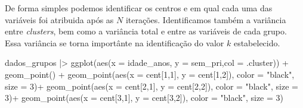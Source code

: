 \documentclass[
  letterpaper,
  DIV=11,
  numbers=noendperiod]{scrreprt}
\newenvironment{Shaded}{\begin{snugshade}}{\end{snugshade}}
\newcommand{\AttributeTok}[1]{\textcolor[rgb]{0.40,0.45,0.13}{#1}}
\newcommand{\DecValTok}[1]{\textcolor[rgb]{0.68,0.00,0.00}{#1}}
\newcommand{\FunctionTok}[1]{\textcolor[rgb]{0.28,0.35,0.67}{#1}}
\newcommand{\NormalTok}[1]{\textcolor[rgb]{0.00,0.23,0.31}{#1}}
\newcommand{\OtherTok}[1]{\textcolor[rgb]{0.00,0.23,0.31}{#1}}
\newcommand{\SpecialCharTok}[1]{\textcolor[rgb]{0.37,0.37,0.37}{#1}}
\newcommand{\StringTok}[1]{\textcolor[rgb]{0.13,0.47,0.30}{#1}}
\begin{document}
De forma simples podemos identificar os centros e em qual cada uma das
variáveis foi atribuida após as \(N\) iterações. Identificamos também a
variância entre \emph{clusters}, bem como a variância total e entre as
variáveis de cada grupo. Essa variância se torna importânte na
identificação do valor \(k\) estabelecido.

\begin{Shaded}
\end{Shaded}

\begin{Shaded}
\begin{Highlighting}[]
\NormalTok{dados\_grupos }\SpecialCharTok{|\textgreater{}} 
  \FunctionTok{ggplot}\NormalTok{(}\FunctionTok{aes}\NormalTok{(}\AttributeTok{x =}\NormalTok{ idade\_anos, }\AttributeTok{y =}\NormalTok{ sem\_pri,}\AttributeTok{col =}\NormalTok{ .cluster)) }\SpecialCharTok{+}
  \FunctionTok{geom\_point}\NormalTok{() }\SpecialCharTok{+}
  \FunctionTok{geom\_point}\NormalTok{(}\FunctionTok{aes}\NormalTok{(}\AttributeTok{x =}\NormalTok{ cent[}\DecValTok{1}\NormalTok{,}\DecValTok{1}\NormalTok{], }\AttributeTok{y =}\NormalTok{ cent[}\DecValTok{1}\NormalTok{,}\DecValTok{2}\NormalTok{]), }\AttributeTok{color =} \StringTok{"black"}\NormalTok{, }\AttributeTok{size =} \DecValTok{3}\NormalTok{)}\SpecialCharTok{+}
  \FunctionTok{geom\_point}\NormalTok{(}\FunctionTok{aes}\NormalTok{(}\AttributeTok{x =}\NormalTok{ cent[}\DecValTok{2}\NormalTok{,}\DecValTok{1}\NormalTok{], }\AttributeTok{y =}\NormalTok{ cent[}\DecValTok{2}\NormalTok{,}\DecValTok{2}\NormalTok{]), }\AttributeTok{color =} \StringTok{"black"}\NormalTok{, }\AttributeTok{size =} \DecValTok{3}\NormalTok{)}\SpecialCharTok{+}
  \FunctionTok{geom\_point}\NormalTok{(}\FunctionTok{aes}\NormalTok{(}\AttributeTok{x =}\NormalTok{ cent[}\DecValTok{3}\NormalTok{,}\DecValTok{1}\NormalTok{], }\AttributeTok{y =}\NormalTok{ cent[}\DecValTok{3}\NormalTok{,}\DecValTok{2}\NormalTok{]), }\AttributeTok{color =} \StringTok{"black"}\NormalTok{, }\AttributeTok{size =} \DecValTok{3}\NormalTok{)}
\end{Highlighting}
\end{Shaded}
\end{document}
